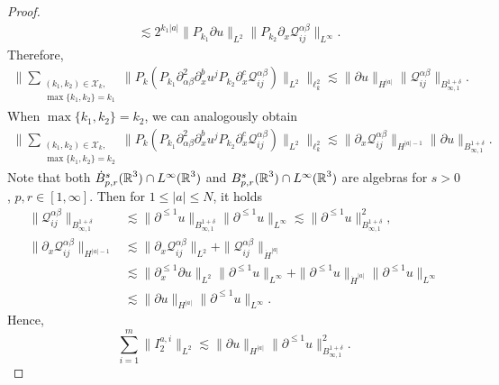 \documentclass[11pt,twoside]{article}
\def\cQ{\mathcal Q}
\def\R{\mathop{\mathbb R\kern 0pt}\nolimits}
\def\p{\partial}
\def\ls{\lesssim}
\theoremstyle{plain}
\theoremstyle{definition}
\numberwithin{equation}{section}
\begin{document}
\begin{proof}
\begin{equation*}
\begin{aligned}
			&\lesssim 2^{k_1|a|} \|P_{k_1} \partial u\|_{L^2} \|P_{k_2} \p_x \cQ^{\alpha\beta}_{ij}\|_{L^\infty}.
		\end{aligned}	
	\end{equation*}
	Therefore,
	\begin{equation*}
		\begin{aligned}
			\big\| \sum_{\substack{(k_1,k_2) \in \mathcal{X}_k, \\ \max\{k_1,k_2\}=k_1}} \| P_k(P_{k_1} \partial_{\alpha\beta}^2 \partial_x^b u^j P_{k_2} \p_x^c\cQ^{\alpha\beta}_{ij} )\|_{L^2}\big\|_{\ell_k^2}
			\lesssim \|\partial u\|_{H^{|a|}}  \| \cQ^{\alpha\beta}_{ij} \|_{B^{1+\delta}_{\infty,1}}.
		\end{aligned}
	\end{equation*}
	When $\max\{k_1, k_2\} = k_2$, we can analogously obtain
	\begin{equation}\label{3.11}
	\begin{aligned}
	\big\| \sum_{\substack{(k_1,k_2) \in \mathcal{X}_k, \\ \max\{k_1,k_2\}=k_2}} \|P_k(P_{k_1} \partial_{\alpha\beta}^2 \partial_x^b u^j P_{k_2} \p_x^c\cQ^{\alpha\beta}_{ij} )\|_{L^2}\big\|_{\ell_k^2}
	\lesssim \|\p_x\cQ^{\alpha\beta}_{ij} \|_{H^{|a|-1}} \| \partial u\|_{B^{1+\delta}_{\infty,1}} .
	\end{aligned}	
	\end{equation}
Note that both $\dot{B}^s_{p,r}(\R^3)\cap L^\infty(\R^3)$ and $B^s_{p,r}(\R^3)\cap L^\infty(\R^3)$ are algebras for $s > 0$, $p,r\in[1,\infty]$.
Then for $1\le |a|\le N$, it holds
\begin{equation*}
\begin{split}
\| \cQ^{\alpha\beta}_{ij} \|_{B^{1+\delta}_{\infty,1}}&\ls \| \p^{\le 1} u \|_{B^{1+\delta}_{\infty,1}}\| \p^{\le 1} u \|_{L^{\infty}}\ls \| \p^{\le 1} u \|_{B^{1+\delta}_{\infty,1}}^2,\\
\|\p_x\cQ^{\alpha\beta}_{ij} \|_{H^{|a|-1}}&\ls\|\p_x\cQ^{\alpha\beta}_{ij} \|_{L^{2}} +\|\cQ^{\alpha\beta}_{ij} \|_{\dot{H}^{|a|}}\\
&\ls\|\partial_x^{\le 1}\partial  u\|_{L^2}\|\partial^{\le 1}  u\|_{L^\infty}
+\|\partial^{\le 1}  u\|_{\dot{H}^{|a|}} \|\partial^{\le 1}  u\|_{L^\infty}\\
&\ls\|\partial u\|_{{H}^{|a|}} \|\partial^{\le 1}  u\|_{L^\infty}.
\end{split}
\end{equation*}
Hence,
\begin{equation*}
\sum_{i=1}^{m}\|I_2^{a,i}\|_{L^2}\ls \|\partial u\|_{H^{|a|}} \|\partial^{\le1} u\|_{B^{1+\delta}_{\infty,1}}^2.

\end{equation*}
\end{proof}
\end{document}
